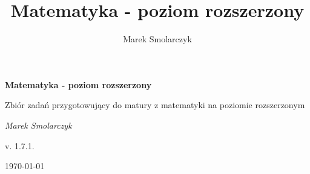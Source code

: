 \documentclass[a4paper,12pt]{book}
\begin{document}
\frontmatter

\begin{titlepage}
	\centering
	{ \bfseries \LARGE Matematyka - poziom rozszerzony \par }
	\vspace{1cm}
	{ \large Zbiór zadań przygotowujący do matury z matematyki na poziomie rozszerzonym \par }
	\vspace{3cm}
	{ \itshape \large Marek Smolarczyk \par }
	\vfill
	{ \large v. 1.7.1. \par }
	\vspace{0.2cm}
	{ \large \today \par }
\end{titlepage}

\author{Marek Smolarczyk}
\title{Matematyka - poziom rozszerzony}

\tableofcontents


\mainmatter



\backmatter
\end{document}
